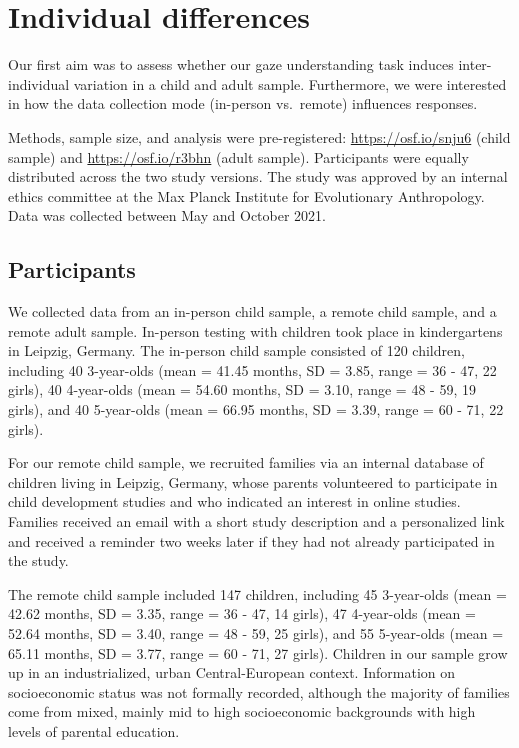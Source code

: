 \documentclass[
  man,floatsintext]{apa6}
\begin{document}
\hypertarget{individual-differences}{%
\section{Individual differences}\label{individual-differences}}

Our first aim was to assess whether our gaze understanding task induces inter-individual variation in a child and adult sample.
Furthermore, we were interested in how the data collection mode (in-person vs.~remote) influences responses.

Methods, sample size, and analysis were pre-registered: \url{https://osf.io/snju6} (child sample) and \url{https://osf.io/r3bhn} (adult sample).
Participants were equally distributed across the two study versions.
The study was approved by an internal ethics committee at the Max Planck Institute for Evolutionary Anthropology.
Data was collected between May and October 2021.

\hypertarget{participants}{%
\subsection{Participants}\label{participants}}

We collected data from an in-person child sample, a remote child sample, and a remote adult sample.
In-person testing with children took place in kindergartens in Leipzig, Germany.
The in-person child sample consisted of 120 children, including 40 3-year-olds (mean = 41.45 months, SD = 3.85, range = 36 - 47, 22 girls), 40 4-year-olds (mean = 54.60 months, SD = 3.10, range = 48 - 59, 19 girls), and 40 5-year-olds (mean = 66.95 months, SD = 3.39, range = 60 - 71, 22 girls).

For our remote child sample, we recruited families via an internal database of children living in Leipzig, Germany, whose parents volunteered to participate in child development studies and who indicated an interest in online studies.
Families received an email with a short study description and a personalized link and received a reminder two weeks later if they had not already participated in the study.

The remote child sample included 147 children, including 45 3-year-olds (mean = 42.62 months, SD = 3.35, range = 36 - 47, 14 girls), 47 4-year-olds (mean = 52.64 months, SD = 3.40, range = 48 - 59, 25 girls), and 55 5-year-olds (mean = 65.11 months, SD = 3.77, range = 60 - 71, 27 girls).
Children in our sample grow up in an industrialized, urban Central-European context.
Information on socioeconomic status was not formally recorded, although the majority of families come from mixed, mainly mid to high socioeconomic backgrounds with high levels of parental education.
\end{document}

